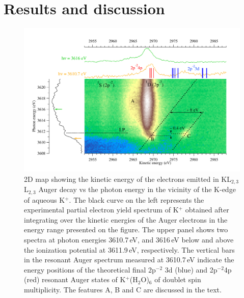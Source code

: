 \section{Results and discussion}\label{sec:rnd}

\begin{figure}%
\centering
\includegraphics[scale=0.55]{figures/k_2dmap.pdf}
\caption{2D map showing the kinetic energy of the electrons emitted in KL$_{2,3}$L$_{2,3}$ Auger decay vs the photon energy in the vicinity of the K-edge of aqueous K$^{+}$. The black curve on the left represents the experimental partial electron yield spectrum of K$^{+}$ obtained after integrating over the kinetic energies of the Auger electrons in the energy range presented on the figure. The upper panel shows two spectra at photon energies 3610.7\,eV, and 3616\,eV below and above the ionization potential at 3611.9\,eV, respectively. The vertical bars in the resonant Auger spectrum measured at 3610.7\,eV indicate the energy positions of the theoretical final 2p$^{-2}$ 3d (blue) and 2p$^{-2}$4p (red) resonant Auger states of K$^{+}$(H$_2$O)$_6$ of doublet spin multiplicity. The features A, B and C are discussed in the text.}
\label{fg:2dmap_k}
\end{figure}


